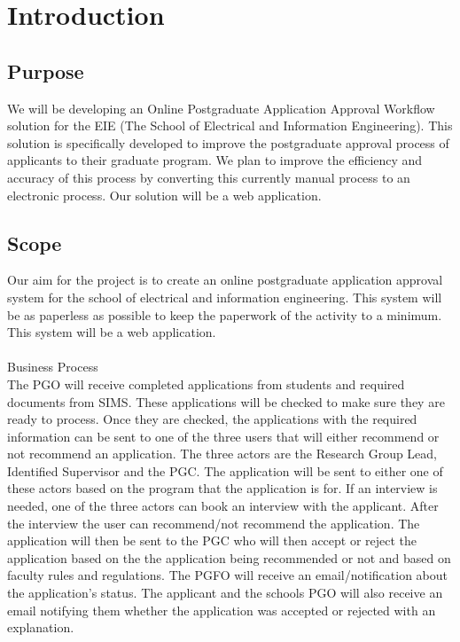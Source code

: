 \documentclass{article}
\begin{document}
\section{Introduction}
\subsection{Purpose}
We will be developing an Online Postgraduate Application Approval Workflow solution for the EIE (The School of Electrical and Information Engineering). This solution is specifically developed to improve the postgraduate approval process of applicants to their graduate program. We plan to improve the efficiency and accuracy of this process by converting this currently manual process to an electronic process. Our solution will be a web application. 

\subsection{Scope}
Our aim for the project is to create an online postgraduate application approval system for the school of electrical and information engineering. This system will be as paperless as possible to keep the paperwork of the activity to a minimum. This system will be a web application. \\ \\
Business Process \\
The PGO will receive completed applications from students and required documents from SIMS. These applications will be checked to make sure they are ready to process. Once they are checked, the applications with the required information can be sent to one of the three users that will either recommend or not recommend an application. The three actors are the Research Group Lead, Identified Supervisor and the PGC. The application will be sent to either one of these actors based on the program that the application is for. If an interview is needed, one of the three actors can book an interview with the applicant. After the interview the user can recommend/not recommend the application. The application will then be sent to the PGC who will then accept or reject the application based on the the application being recommended or not and based on faculty rules and regulations. The PGFO will receive an email/notification about the application's status. The applicant and the schools PGO will also receive an email notifying them whether the application was accepted or rejected with an explanation.
\end{document}
